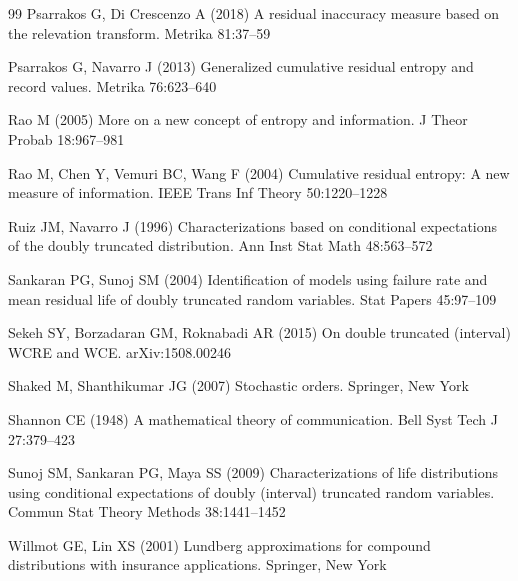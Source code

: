 \documentclass[11pt]{article}
\begin{document}
\begin{thebibliography}{99}
Psarrakos G, Di Crescenzo A (2018) A residual inaccuracy measure based on the relevation transform. Metrika 81:37--59

Psarrakos G, Navarro J (2013) Generalized cumulative residual entropy and record values. Metrika 76:623--640

Rao M (2005) More on a new concept of entropy and information. J Theor Probab 18:967--981

Rao M, Chen Y, Vemuri BC, Wang F (2004) Cumulative residual entropy: A new measure of information. IEEE Trans Inf Theory 50:1220--1228

Ruiz JM, Navarro J (1996) Characterizations based on conditional expectations of the doubly truncated distribution. Ann Inst Stat Math 48:563--572

Sankaran PG, Sunoj SM (2004) Identification of models using failure rate and mean residual life of doubly truncated random variables. Stat Papers 45:97--109

Sekeh SY, Borzadaran GM, Roknabadi AR (2015) On double truncated (interval) WCRE and WCE. arXiv:1508.00246

Shaked M, Shanthikumar JG (2007) Stochastic orders. Springer, New York

Shannon CE (1948) A mathematical theory of communication. Bell Syst Tech J 27:379--423

Sunoj SM, Sankaran PG, Maya SS (2009) Characterizations of life distributions using conditional expectations of doubly (interval) truncated random variables. Commun Stat Theory Methods 38:1441--1452

Willmot GE, Lin XS (2001) Lundberg approximations for compound distributions with insurance applications. Springer, New York

\end{thebibliography}
\end{document}
